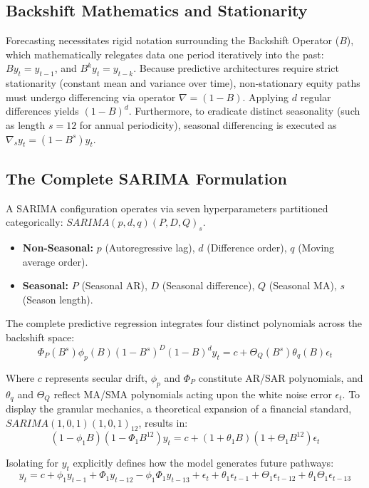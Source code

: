 \documentclass[12pt,a4paper]{report}
\begin{document}
\subsection{Backshift Mathematics and Stationarity}
Forecasting necessitates rigid notation surrounding the Backshift Operator ($B$), which mathematically relegates data one period iteratively into the past: $B y_t = y_{t-1}$, and $B^k y_t = y_{t-k}$. Because predictive architectures require strict stationarity (constant mean and variance over time), non-stationary equity paths must undergo differencing via operator $\nabla = (1-B)$. 
Applying $d$ regular differences yields $(1-B)^d$. Furthermore, to eradicate distinct seasonality (such as length $s=12$ for annual periodicity), seasonal differencing is executed as $\nabla_s y_t = (1-B^s)y_t$. 

\subsection{The Complete SARIMA Formulation}
A SARIMA configuration operates via seven hyperparameters partitioned categorically: $SARIMA(p, d, q)(P, D, Q)_s$.
\begin{itemize}
    \item \textbf{Non-Seasonal:} $p$ (Autoregressive lag), $d$ (Difference order), $q$ (Moving average order).
    \item \textbf{Seasonal:} $P$ (Seasonal AR), $D$ (Seasonal difference), $Q$ (Seasonal MA), $s$ (Season length).
\end{itemize}

The complete predictive regression integrates four distinct polynomials across the backshift space:
\begin{equation}
\Phi_P (B^s) \phi_p (B) (1-B^s)^D (1-B)^d y_t = c + \Theta_Q (B^s) \theta_q (B) \epsilon_t
\end{equation}

Where $c$ represents secular drift, $\phi_p$ and $\Phi_P$ constitute AR/SAR polynomials, and $\theta_q$ and $\Theta_Q$ reflect MA/SMA polynomials acting upon the white noise error $\epsilon_t$. To display the granular mechanics, a theoretical expansion of a financial standard, $SARIMA(1,0,1)(1,0,1)_{12}$, results in:
\begin{equation}
(1 - \phi_1 B)(1 - \Phi_1 B^{12}) y_t = c + (1 + \theta_1 B)(1 + \Theta_1 B^{12}) \epsilon_t 
\end{equation}

Isolating for $y_t$ explicitly defines how the model generates future pathways:
\begin{equation}
y_t = c + \phi_1 y_{t-1} + \Phi_1 y_{t-12} - \phi_1\Phi_1 y_{t-13} + \epsilon_t + \theta_1 \epsilon_{t-1} + \Theta_1 \epsilon_{t-12} + \theta_1\Theta_1 \epsilon_{t-13}
\end{equation}
\end{document}
